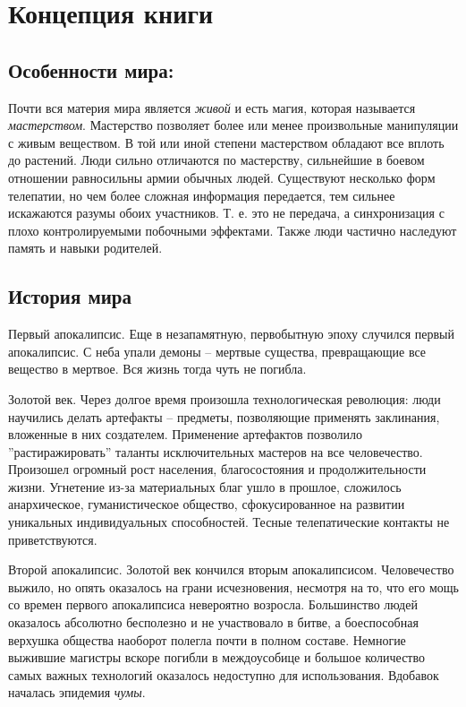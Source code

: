 \documentclass[12pt,a4paper]{article}
\begin{document}
\pagestyle{empty}

\section*{Концепция книги}
\subsection*{Особенности мира:}

Почти вся материя мира является \textit{живой} и есть магия, которая называется \textit{мастерством}. Мастерство позволяет более или менее произвольные манипуляции с живым веществом. В той или иной степени мастерством обладают все вплоть до растений. Люди сильно отличаются по мастерству, сильнейшие в боевом отношении равносильны армии обычных людей.
Существуют несколько форм телепатии, но чем более сложная информация передается, тем сильнее искажаются разумы обоих участников. Т. е. это не передача, а синхронизация с плохо контролируемыми побочными эффектами.
Также люди частично наследуют память и навыки родителей.

\subsection*{История мира}
Первый апокалипсис. Еще в незапамятную, первобытную эпоху случился первый апокалипсис. С неба упали демоны -- мертвые существа, превращающие все вещество в мертвое. Вся жизнь тогда чуть не погибла.

Золотой век. Через долгое время произошла технологическая революция: люди научились делать артефакты -- предметы, позволяющие применять заклинания, вложенные в них создателем. Применение артефактов позволило ''растиражировать'' таланты исключительных мастеров на все человечество. Произошел огромный рост населения, благосостояния и продолжительности жизни. Угнетение из-за материальных благ ушло в прошлое, сложилось анархическое, гуманистическое общество, сфокусированное на развитии уникальных индивидуальных способностей. Тесные телепатические контакты не приветствуются.

Второй апокалипсис. Золотой век кончился вторым апокалипсисом. Человечество выжило, но опять оказалось на грани исчезновения, несмотря на то, что его мощь со времен первого апокалипсиса невероятно возросла. Большинство людей оказалось абсолютно бесполезно и не участвовало в битве, а боеспособная верхушка общества наоборот полегла почти в полном составе. Немногие выжившие магистры вскоре погибли в междоусобице и большое количество самых важных технологий оказалось недоступно для использования. Вдобавок началась эпидемия \textit{чумы}. 
\end{document}
